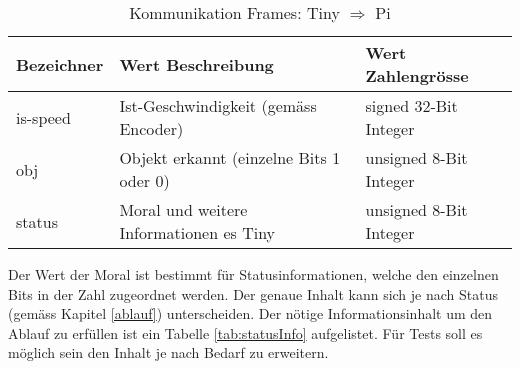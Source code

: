 \documentclass[../../main.tex]{subfiles}
\begin{document}
    \begin{table}[H] \centering
        \begin{tabular}{|l|l|l|}
        \hline
        \textbf{Bezeichner} & \textbf{Wert Beschreibung}                                  & \textbf{Wert Zahlengrösse} \\ \hline
        is-speed            & Ist-Geschwindigkeit (gemäss Encoder)                        & signed 32-Bit Integer      \\ \hline
        obj                 & Objekt erkannt (einzelne Bits 1 oder 0)                     & unsigned 8-Bit Integer     \\ \hline
        status              & Moral und weitere Informationen es Tiny                     & unsigned 8-Bit Integer     \\ \hline
        \end{tabular}

        \caption{Kommunikation Frames: Tiny $\Rightarrow$ Pi}
        \label{tab:com_tiny_pi}
        \end{table}

        Der Wert der Moral ist bestimmt für Statusinformationen, welche den einzelnen Bits in der Zahl zugeordnet werden. Der genaue Inhalt kann sich je nach Status (gemäss Kapitel \ref{ablauf}) unterscheiden. Der nötige Informationsinhalt um den Ablauf zu erfüllen ist ein Tabelle \ref{tab:statusInfo} aufgelistet. Für Tests soll es möglich sein den Inhalt je nach Bedarf zu erweitern.
\end{document}
